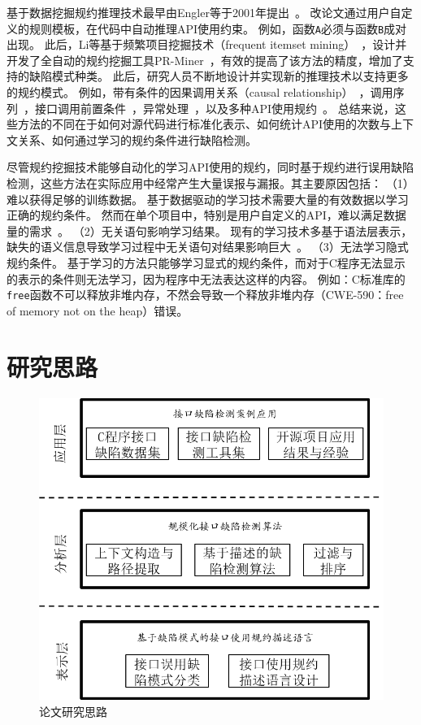 基于数据挖掘规约推理技术最早由Engler等于2001年提出~\cite{01-sosp-mining}。
改论文通过用户自定义的规则模板，在代码中自动推理API使用约束。
例如，函数\texttt{A}必须与函数\texttt{B}成对出现。
此后，Li等基于频繁项目挖掘技术（frequent itemset mining）~\cite{03-fimi-frequent}，设计并开发了全自动的规约挖掘工具PR-Miner~\cite{05-fse-prminer}，有效的提高了该方法的精度，增加了支持的缺陷模式种类。
此后，研究人员不断地设计并实现新的推理技术以支持更多的规约模式。
例如，带有条件的因果调用关系（causal relationship）~\cite{07-fse-temporal}，调用序列~\cite{09-ase-sequence}，接口调用前置条件~\cite{14-fse-pre}，异常处理~\cite{16-ase-apex}，以及多种API使用规约~\cite{16-sec-apisan}。
总结来说，这些方法的不同在于如何对源代码进行标准化表示、如何统计API使用的次数与上下文关系、如何通过学习的规约条件进行缺陷检测。

尽管规约挖掘技术能够自动化的学习API使用的规约，同时基于规约进行误用缺陷检测，这些方法在实际应用中经常产生大量误报与漏报。其主要原因包括：
（1）难以获得足够的训练数据。
基于数据驱动的学习技术需要大量的有效数据以学习正确的规约条件。
然而在单个项目中，特别是用户自定义的API，难以满足数据量的需求~\cite{15-kernel-sv,survey18}。
（2）无关语句影响学习结果。
现有的学习技术多基于语法层表示，缺失的语义信息导致学习过程中无关语句对结果影响巨大~\cite{16-icse-antminer}。
（3）无法学习隐式规约条件。
基于学习的方法只能够学习显式的规约条件，而对于C程序无法显示的表示的条件则无法学习，因为程序中无法表达这样的内容。
例如：C标准库的\texttt{free}函数不可以释放非堆内存，不然会导致一个释放非堆内存（CWE-590：free of memory not on the heap）错误。


\section{研究思路}

\begin{figure}[b]
	\centering
	\includegraphics[width=0.8\linewidth]{figures/cp1-overview.png}
	\caption{
		论文研究思路
	}
	\label{fig:1-3-overview}
\end{figure}

